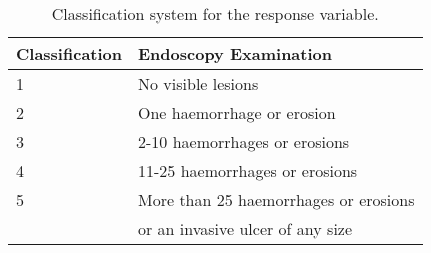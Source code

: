 
\begin{center}
\begin{longtable}{ll}
\caption{Classification system for the response variable. \label{CI:scores}}
\\
Classification & Endoscopy Examination \\ \hline
1 & No visible lesions \\
2 & One haemorrhage or erosion \\
3 & 2-10 haemorrhages or erosions \\
4 & 11-25 haemorrhages or erosions \\
5 & More than 25 haemorrhages or erosions \\ 
  & or an invasive ulcer of any size\\ \hline
\end{longtable}
\end{center}
